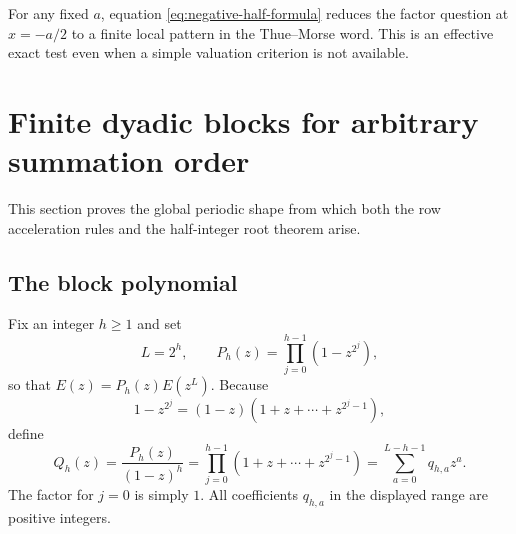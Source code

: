 \documentclass[11pt,oneside]{article}
\numberwithin{equation}{section}
\theoremstyle{definition}
\theoremstyle{remark}
\begin{document}
For any fixed \(a\), equation \eqref{eq:negative-half-formula} reduces the
factor question at \(x=-a/2\) to a finite local pattern in the Thue--Morse
word.  This is an effective exact test even when a simple valuation criterion
is not available.

\section{Finite dyadic blocks for arbitrary summation order}

This section proves the global periodic shape from which both the row
acceleration rules and the half-integer root theorem arise.

\subsection{The block polynomial}

Fix an integer \(h\ge1\) and set
\begin{equation}
 L=2^h,
 \qquad
 P_h(z)=\prod_{j=0}^{h-1}(1-z^{2^j}),
 \label{eq:Ph-L}
\end{equation}
so that \(E(z)=P_h(z)E(z^L)\).  Because
\[
 1-z^{2^j}=(1-z)(1+z+\cdots+z^{2^j-1}),
\]
define
\begin{equation}
 Q_h(z)=\frac{P_h(z)}{(1-z)^h}
 =\prod_{j=0}^{h-1}(1+z+\cdots+z^{2^j-1})
 =\sum_{a=0}^{L-h-1}q_{h,a}z^a.
 \label{eq:Qh-definition}
\end{equation}
The factor for \(j=0\) is simply \(1\).  All coefficients
\(q_{h,a}\) in the displayed range are positive integers.
\end{document}
